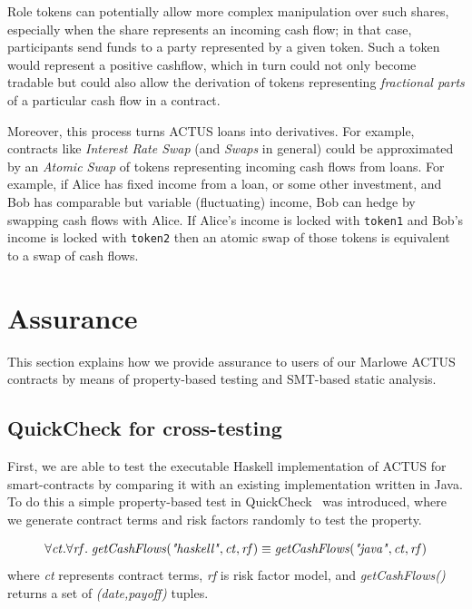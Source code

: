 \documentclass[runningheads]{llncs}
\newcommand{\ident}[1]{\mbox{\emph{#1}}}
\begin{document}
Role tokens can potentially allow more complex manipulation over such shares,
especially when the share represents an incoming cash flow; in that case, participants
send funds to a party represented by a given token. Such a token
would represent a positive cashflow, which in turn could not only become
tradable but could also allow the derivation of tokens representing \emph{fractional parts}
of a particular cash flow in a contract.

Moreover, this process turns ACTUS loans into derivatives. For example, contracts
like \emph{Interest Rate Swap} (and \emph{Swaps} in general) could be approximated
by an \emph{Atomic Swap} of tokens representing incoming cash flows from
loans. 
For example, if Alice has fixed income from a loan, or some other
investment, and Bob has comparable but variable (fluctuating) income,
Bob can hedge by swapping cash flows with Alice. If Alice's income
is locked with \texttt{token1} and Bob's income is locked with \texttt{token2} then an
atomic swap of those tokens is equivalent to a swap of cash flows.

\section{Assurance}
\label{assurance}

This section explains how we provide assurance to users of our Marlowe ACTUS contracts by means of property-based testing and SMT-based static analysis.

\subsection{QuickCheck for cross-testing}

First, we are able to test the executable Haskell implementation
of ACTUS for smart-contracts by comparing it with an existing implementation written in Java. To do this  
a simple property-based test in QuickCheck~\cite{qc} was introduced, where we generate contract terms and risk factors randomly to test the property.

\newcommand{\rf}{\ident{rf}}
\newcommand{\ct}{\ident{ct}}
\smallskip
\noindent 
\begin{equation*}
\forall \ct.\forall \rf. \; \ident{getCashFlows}(\ident{"haskell"},\ct,\rf)\equiv \ident{getCashFlows}(\ident{"java"},\ct,\rf)
\end{equation*}
\noindent
where \emph{ct} represents contract terms, \emph{rf} is risk factor model, and
\emph{getCashFlows()} returns a set of \emph{(date,payoff)} tuples.
\end{document}
